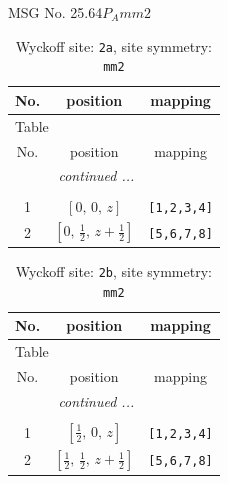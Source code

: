 \documentclass[fleqn,8pt]{jsarticle}
\begin{document}
\setcounter{MaxMatrixCols}{32}

\renewcommand{\tablename}{Table~}
\renewcommand{\figurename}{Figure~}
\begin{center}
\LARGE
MSG No. 25.64\quad$P_{A}mm2$
\end{center}
\renewcommand{\arraystretch}{1.2}
\begin{longtable}{ccc}
\caption{Wyckoff site: {\tt 2a}, site symmetry: {\tt mm2}}
 \\
 \hline \hline
No. & position & mapping \\ \hline \endfirsthead

\multicolumn{2}{l}{\tablename\ \thetable{}} \\
 \hline \hline
No. & position & mapping \\ \hline \endhead

 \hline \hline
\multicolumn{2}{r}{\footnotesize\it continued ...} \\ \endfoot

 \hline \hline
\multicolumn{2}{r}{} \\ \endlastfoot

1 & $\left[ 0,\, 0,\, z \right]$ & {\tt [1,2,3,4]} \\ \hline
2 & $\left[ 0,\, \frac{1}{2},\, z + \frac{1}{2} \right]$ & {\tt [5,6,7,8]} \\
\end{longtable}
\renewcommand{\arraystretch}{1.2}
\begin{longtable}{ccc}
\caption{Wyckoff site: {\tt 2b}, site symmetry: {\tt mm2}}
 \\
 \hline \hline
No. & position & mapping \\ \hline \endfirsthead

\multicolumn{2}{l}{\tablename\ \thetable{}} \\
 \hline \hline
No. & position & mapping \\ \hline \endhead

 \hline \hline
\multicolumn{2}{r}{\footnotesize\it continued ...} \\ \endfoot

 \hline \hline
\multicolumn{2}{r}{} \\ \endlastfoot

1 & $\left[ \frac{1}{2},\, 0,\, z \right]$ & {\tt [1,2,3,4]} \\ \hline
2 & $\left[ \frac{1}{2},\, \frac{1}{2},\, z + \frac{1}{2} \right]$ & {\tt [5,6,7,8]} \\
\end{longtable}
\end{document}
